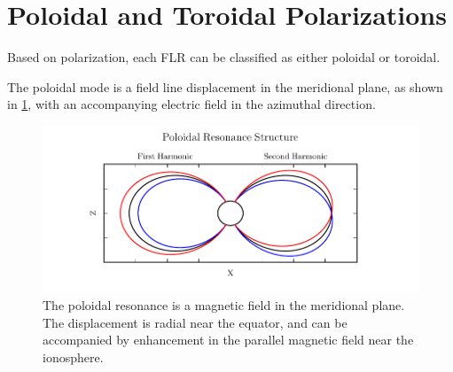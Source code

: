 



\section{Poloidal and Toroidal Polarizations}

Based on polarization, each FLR can be classified as either poloidal or toroidal. 

The poloidal mode is a field line displacement in the meridional plane, as shown in \cref{fig_poloidal}, with an accompanying electric field in the azimuthal direction. 

\begin{figure}[!htb]
    \centering
    \includegraphics[width=\textwidth]{figures/poloidal.pdf}
    \caption[Poloidal Mode Structure]{
      The poloidal resonance is a magnetic field in the meridional plane. The displacement is radial near the equator, and can be accompanied by enhancement in the parallel magnetic field near the ionosphere. 
    }
    \label{fig_poloidal}
\end{figure}

